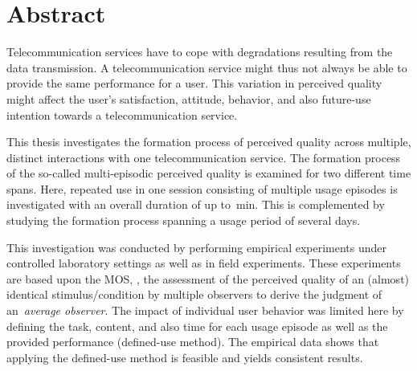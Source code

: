 
\chapter*{Abstract}
Telecommunication services have to cope with degradations resulting from the data transmission.
A telecommunication service might thus not always be able to provide the same performance for a user.
This variation in perceived quality might affect the user's satisfaction, attitude, behavior, and also future-use intention towards a telecommunication service.

This thesis investigates the formation process of perceived quality across multiple, distinct interactions with one telecommunication service.
The formation process of the so-called multi-episodic perceived quality is examined for two different time spans.
Here, repeated use in one session consisting of multiple usage episodes is investigated with an overall duration of up to~\unit[45]{min}.
This is complemented by studying the formation process spanning a usage period of several days.

This investigation was conducted by performing empirical experiments under controlled laboratory settings as well as in field experiments.
These experiments are based upon the \acf{MOS}, \ie, the assessment of the perceived quality of an (almost) identical stimulus/condition by multiple observers to derive the judgment of an~\emph{average observer}.
The impact of individual user behavior was limited here by defining the task, content, and also time for each usage episode as well as the provided performance (defined-use method).
The empirical data shows that applying the defined-use method is feasible and yields consistent results.

